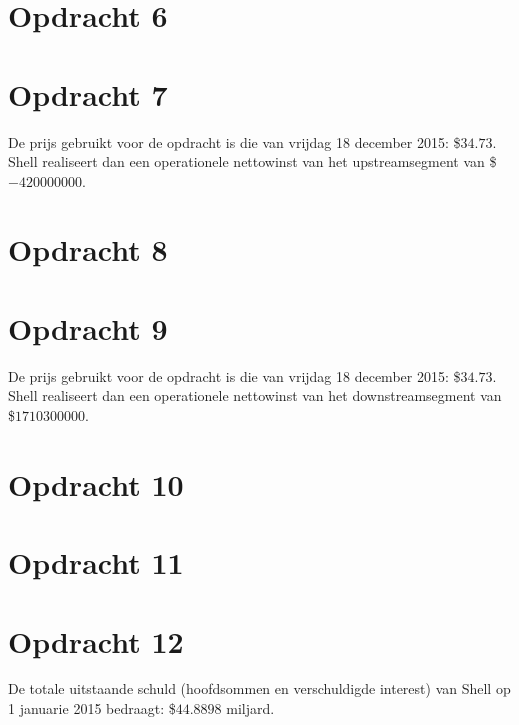 \documentclass[11pt,a4paper]{article}
\begin{document}
\section*{Opdracht 6}



\section*{Opdracht 7}
De prijs gebruikt voor de opdracht is die van vrijdag 18 december 2015: \$$34.73$.
Shell realiseert dan een operationele nettowinst van het upstreamsegment van \$$-420000000$.


\section*{Opdracht 8}



\section*{Opdracht 9}
De prijs gebruikt voor de opdracht is die van vrijdag 18 december 2015: \$$34.73$.
Shell realiseert dan een operationele nettowinst van het downstreamsegment van \$$1710300000$.



\section*{Opdracht 10}



\section*{Opdracht 11}



\section*{Opdracht 12}
De totale uitstaande schuld (hoofdsommen en verschuldigde interest) van Shell op 1 januarie 2015 bedraagt: \$$44.8898$ miljard.

\end{document}
